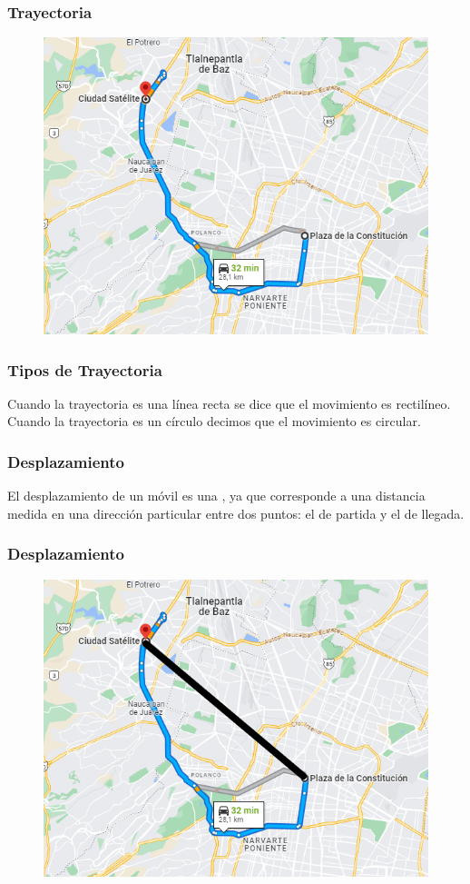\documentclass[14pt]{beamer}
\begin{document}
\begin{frame}
\frametitle{Trayectoria}
\begin{figure}
    \centering
    \includegraphics[scale=0.45]{Imagenes/Trayectoria_01.png}
\end{figure}
\end{frame}
\begin{frame}
\frametitle{Tipos de Trayectoria}
Cuando la trayectoria es una línea recta se dice que el movimiento es rectilíneo.
\\
\bigskip
\pause
Cuando la trayectoria es un círculo decimos que el movimiento es circular.
\end{frame}
\begin{frame}
\frametitle{Desplazamiento}
El desplazamiento de un móvil es una , ya que corresponde a una distancia medida en una dirección particular entre dos puntos: el de partida y el de llegada.
\end{frame}
\begin{frame}
\frametitle{Desplazamiento}
\begin{figure}
    \centering
    \includegraphics[scale=0.45]{Imagenes/Trayectoria_02.png}
\end{figure}
\end{frame}
\end{document}
